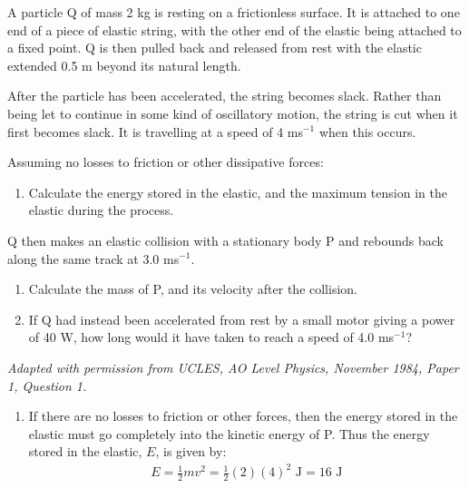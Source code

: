 
\begin{problem}[AO1984PIQ1a]
{A particle Q of mass 2 kg is resting on a frictionless surface. It is attached to one end of a piece of elastic string, with the other end of the elastic being attached to a fixed point. Q is then pulled back and released from rest with the elastic extended 0.5 m beyond its natural length. 

After the particle has been accelerated, the string becomes slack. Rather than being let to continue in some kind of oscillatory motion, the string is cut when it first becomes slack. It is travelling at a speed of 4 ms$^{-1}$ when this occurs.

Assuming no losses to friction or other dissipative forces:
\begin{enumerate}
	\item Calculate the energy stored in the elastic, and the maximum tension in the elastic during the process.
\end{enumerate}
Q then makes an elastic collision with a stationary body P and rebounds back along the same track at 3.0 ms$^{-1}$. \begin{enumerate}[resume]
	\item Calculate the mass of P, and its velocity after the collision.
	\item If Q had instead been accelerated from rest by a small motor giving a power of 40 W, how long would it have taken to reach a speed of 4.0 ms$^{-1}$?
\end{enumerate}
\vspace{-0.4cm}
}
{\textit{Adapted with permission from UCLES, AO Level Physics, November 1984, Paper 1, Question 1.}}
{\begin{enumerate}
	\item If there are no losses to friction or other forces, then the energy stored in the elastic must go completely into the kinetic energy of P. Thus the energy stored in the elastic, $E$, is given by:
\begin{align*} E = \frac{1}{2}mv^{2} = \frac{1}{2}(2)(4)^{2} \textrm{ J} = 16 \textrm{ J} \end{align*}


\end{enumerate}}
\end{problem}
